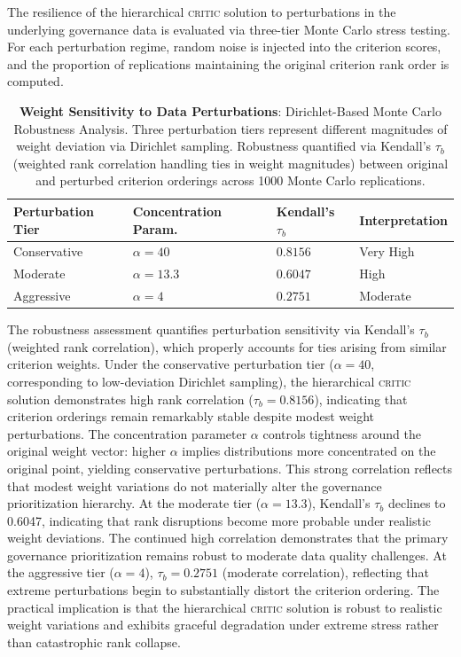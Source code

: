 \documentclass[12pt,a4paper]{article}
\newcommand{\CRITIC}{\textsc{critic}\xspace}
\begin{document}
\FloatBarrier

The resilience of the hierarchical \CRITIC solution to perturbations in the underlying governance data is evaluated via three-tier Monte Carlo stress testing. For each perturbation regime, random noise is injected into the criterion scores, and the proportion of replications maintaining the original criterion rank order is computed.

\begin{table}[H]
\centering
\caption{\textbf{Weight Sensitivity to Data Perturbations}: Dirichlet-Based Monte Carlo Robustness Analysis. Three perturbation tiers represent different magnitudes of weight deviation via Dirichlet sampling. Robustness quantified via Kendall's $\tau_b$ (weighted rank correlation handling ties in weight magnitudes) between original and perturbed criterion orderings across 1000 Monte Carlo replications.}
\label{tab:weight-sensitivity}
\small
\begin{tabularx}{0.80\textwidth}{>{\centering\arraybackslash}X>{\centering\arraybackslash}X>{\centering\arraybackslash}X>{\centering\arraybackslash}X}
\toprule
\textbf{Perturbation Tier} & \textbf{Concentration Param.} & \textbf{Kendall's $\tau_b$} & \textbf{Interpretation} \\
\midrule
Conservative & $\alpha = 40$ & $0.8156$ & Very High \\
Moderate & $\alpha = 13.3$ & $0.6047$ & High \\
Aggressive & $\alpha = 4$ & $0.2751$ & Moderate \\
\bottomrule
\end{tabularx}
\end{table}

\FloatBarrier

The robustness assessment quantifies perturbation sensitivity via Kendall's $\tau_b$ (weighted rank correlation), which properly accounts for ties arising from similar criterion weights. Under the conservative perturbation tier ($\alpha = 40$, corresponding to low-deviation Dirichlet sampling), the hierarchical \CRITIC solution demonstrates high rank correlation ($\tau_b = 0.8156$), indicating that criterion orderings remain remarkably stable despite modest weight perturbations. The concentration parameter $\alpha$ controls tightness around the original weight vector: higher $\alpha$ implies distributions more concentrated on the original point, yielding conservative perturbations. This strong correlation reflects that modest weight variations do not materially alter the governance prioritization hierarchy. At the moderate tier ($\alpha = 13.3$), Kendall's $\tau_b$ declines to 0.6047, indicating that rank disruptions become more probable under realistic weight deviations. The continued high correlation demonstrates that the primary governance prioritization remains robust to moderate data quality challenges. At the aggressive tier ($\alpha = 4$), $\tau_b = 0.2751$ (moderate correlation), reflecting that extreme perturbations begin to substantially distort the criterion ordering. The practical implication is that the hierarchical \CRITIC solution is robust to realistic weight variations and exhibits graceful degradation under extreme stress rather than catastrophic rank collapse.
\end{document}
